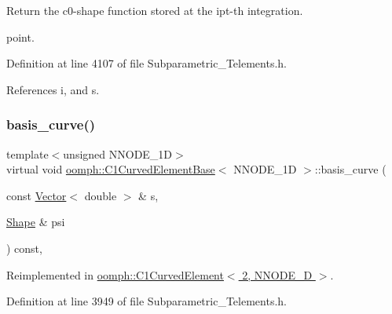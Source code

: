 Return the c0-\/shape function stored at the ipt-\/th integration. 

point. 

Definition at line 4107 of file Subparametric\+\_\+\+Telements.\+h.



References i, and s.

\mbox{\label{classoomph_1_1C1CurvedElementBase_a9aca3e797997aeb999987b6f69c31320}} 
\subsubsection{\texorpdfstring{basis\+\_\+curve()}{basis\_curve()}}
{\footnotesize\ttfamily template$<$unsigned N\+N\+O\+D\+E\+\_\+1D$>$ \\
virtual void \hyperlink{classoomph_1_1C1CurvedElementBase}{oomph\+::\+C1\+Curved\+Element\+Base}$<$ N\+N\+O\+D\+E\+\_\+1D $>$\+::basis\+\_\+curve (\begin{DoxyParamCaption}\item[{const \hyperlink{classoomph_1_1Vector}{Vector}$<$ double $>$ \&}]{s,  }\item[{\hyperlink{classoomph_1_1Shape}{Shape} \&}]{psi }\end{DoxyParamCaption}) const\hspace{0.3cm}{\ttfamily [inline]}, {\ttfamily [virtual]}}



Reimplemented in \hyperlink{classoomph_1_1C1CurvedElement_3_012_00_01NNODE__1D_01_4_a97e774d78da4118400b554ddf59fdbeb}{oomph\+::\+C1\+Curved\+Element$<$ 2, N\+N\+O\+D\+E\+\_\+D $>$}.



Definition at line 3949 of file Subparametric\+\_\+\+Telements.\+h.

\mbox{\label{classoomph_1_1C1CurvedElementBase_a256c9d25d9f4c9067914b39d1cc4c6fa}} 
